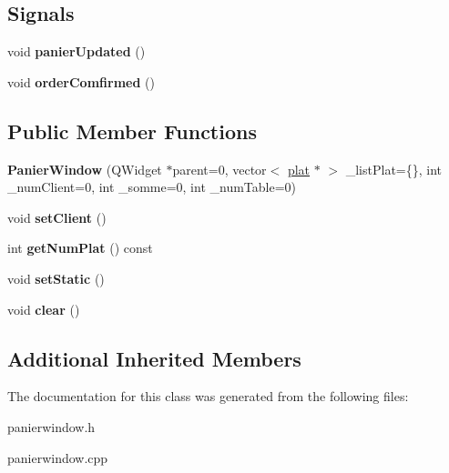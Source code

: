 \subsection*{Signals}
\begin{DoxyCompactItemize}
\item 
void {\bfseries panier\+Updated} ()\hypertarget{class_panier_window_a059e18b2912d43ccdaba98943b699f8e}{}\label{class_panier_window_a059e18b2912d43ccdaba98943b699f8e}

\item 
void {\bfseries order\+Comfirmed} ()\hypertarget{class_panier_window_abf1be94aa02ed66ed7748433afc0d031}{}\label{class_panier_window_abf1be94aa02ed66ed7748433afc0d031}

\end{DoxyCompactItemize}
\subsection*{Public Member Functions}
\begin{DoxyCompactItemize}
\item 
{\bfseries Panier\+Window} (Q\+Widget $\ast$parent=0, vector$<$ \hyperlink{classplat}{plat} $\ast$ $>$ \+\_\+list\+Plat=\{\}, int \+\_\+num\+Client=0, int \+\_\+somme=0, int \+\_\+num\+Table=0)\hypertarget{class_panier_window_a03625b947e777b58c3dab33657d62753}{}\label{class_panier_window_a03625b947e777b58c3dab33657d62753}

\item 
void {\bfseries set\+Client} ()\hypertarget{class_panier_window_af41e891bf03a3decb1f37ddf7282d8d9}{}\label{class_panier_window_af41e891bf03a3decb1f37ddf7282d8d9}

\item 
int {\bfseries get\+Num\+Plat} () const \hypertarget{class_panier_window_a84e5101efc685171bcce0dcd7816a20e}{}\label{class_panier_window_a84e5101efc685171bcce0dcd7816a20e}

\item 
void {\bfseries set\+Static} ()\hypertarget{class_panier_window_a96b962be7668b710cf9a0dfe6682e9e7}{}\label{class_panier_window_a96b962be7668b710cf9a0dfe6682e9e7}

\item 
void {\bfseries clear} ()\hypertarget{class_panier_window_a058823a91b93f36c405480f21d4ef67b}{}\label{class_panier_window_a058823a91b93f36c405480f21d4ef67b}

\end{DoxyCompactItemize}
\subsection*{Additional Inherited Members}


The documentation for this class was generated from the following files\+:\begin{DoxyCompactItemize}
\item 
panierwindow.\+h\item 
panierwindow.\+cpp\end{DoxyCompactItemize}
